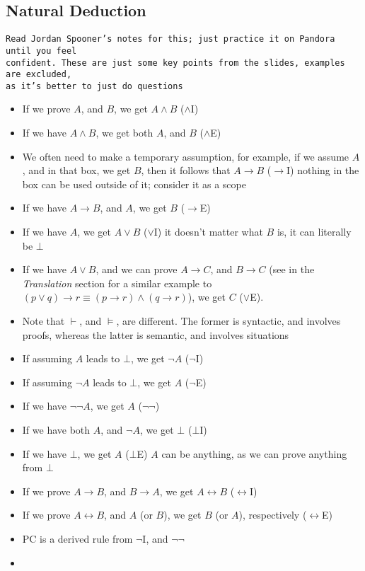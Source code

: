 \documentclass[a4paper, 12pt]{article}
\begin{document}
        \subsection*{Natural Deduction}
        \texttt{Read Jordan Spooner's notes for this; just practice it on Pandora until you feel \\ confident. These are just some key points from the slides, examples are excluded, \\ as it's better to just do questions}
        \begin{itemize}
            \item If we prove $A$, and $B$, we get $A \land B$ ($\land$I)
            \item If we have $A \land B$, we get both $A$, and $B$ ($\land$E)
            \item We often need to make a temporary assumption, for example, if we assume $A$, and in that box, we get $B$, then it follows that $A \rightarrow B$ ($\rightarrow$I)
                \subitem nothing in the box can be used outside of it; consider it as a scope
            \item If we have $A \rightarrow B$, and $A$, we get $B$ ($\rightarrow$E)
            \item If we have $A$, we get $A \lor B$ ($\lor$I)
                \subitem it doesn't matter what $B$ is, it can literally be $\bot$
            \item If we have $A \lor B$, and we can prove $A \rightarrow C$, and $B \rightarrow C$ (see in the \textit{Translation} section  for a similar example to $(p \lor q) \rightarrow r \equiv (p \rightarrow r) \land (q \rightarrow r)$), we get $C$ ($\lor$E).
            \item Note that $\vdash$, and $\vDash$, are different. The former is syntactic, and involves proofs, whereas the latter is semantic, and involves situations
            \item If assuming $A$ leads to $\bot$, we get $\neg A$ ($\neg$I)
            \item If assuming $\neg A$ leads to $\bot$, we get $A$ ($\neg$E)
            \item If we have $\neg \neg A$, we get $A$ ($\neg \neg$)
            \item If we have both $A$, and $\neg A$, we get $\bot$ ($\bot$I)
            \item If we have $\bot$, we get $A$ ($\bot$E)
                \subitem $A$ can be anything, as we can prove anything from $\bot$
            \item If we prove $A \rightarrow B$, and $B \rightarrow A$, we get $A \leftrightarrow B$ ($\leftrightarrow$I)
            \item If we prove $A \leftrightarrow B$, and $A$ (or $B$), we get $B$ (or $A$), respectively ($\leftrightarrow$E)
            \item PC is a derived rule from $\neg$I, and $\neg \neg$
            \item 
        \end{itemize}
\end{document}
